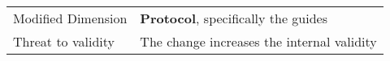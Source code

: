 \begin{table*}[h]
\begin{tabularx}{\textwidth}{
  >{\hsize=0.3\hsize}X
  >{\hsize=0.8\hsize}X}
     Modified Dimension & 
    \textbf{Protocol}, specifically the guides \\   
    Threat to validity & The change increases the internal validity  \\  \hline
    
	\end{tabularx}  
	
\end{table*}